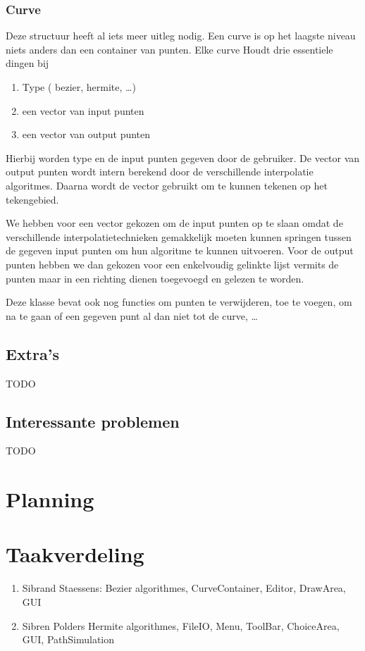 \documentclass[a4paper,11pt,oneside, titlepage]{article}
\begin{document}
\subsubsection{Curve}
Deze structuur heeft al iets meer uitleg nodig. Een curve is op het laagste niveau niets 
anders dan een container van punten.\newline
Elke curve Houdt drie essentiele dingen bij
\begin{enumerate}
\item Type ( bezier, hermite, \ldots )
\item een vector van input punten
\item een vector van output punten
\end{enumerate}

Hierbij worden type en de input punten gegeven door de gebruiker. De vector van output punten
wordt intern berekend door de verschillende interpolatie algoritmes. Daarna wordt de vector
gebruikt om te kunnen tekenen op het tekengebied.\newline

We hebben voor een vector gekozen om de input punten op te slaan omdat de verschillende
interpolatietechnieken gemakkelijk moeten kunnen springen tussen de gegeven input punten om
hun algoritme te kunnen uitvoeren. Voor de output punten hebben we dan gekozen voor een 
enkelvoudig gelinkte lijst vermits de punten maar in een richting dienen toegevoegd en gelezen
te worden.

Deze klasse bevat ook nog functies om punten te verwijderen, toe te voegen, om na te gaan of een gegeven punt al dan niet tot de curve, \ldots
\subsection{Extra's}
TODO
\subsection{Interessante problemen}
TODO
\newpage
\section{Planning}
\newpage
\section{Taakverdeling}
\begin{enumerate}
\item Sibrand Staessens:
       Bezier algorithmes, CurveContainer, Editor, DrawArea, GUI
\item Sibren Polders
       Hermite algorithmes, FileIO, Menu, ToolBar, ChoiceArea, GUI, PathSimulation
\end{enumerate}
\newpage
\end{document}
